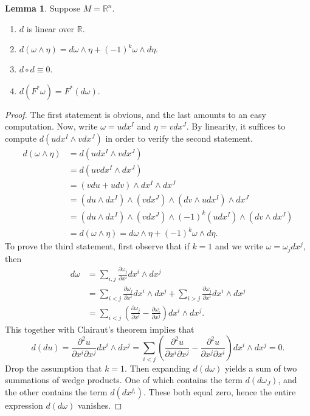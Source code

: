 \documentclass[10pt,letterpaper,cm]{nupset}
\theoremstyle{definition}
\theoremstyle{theorem}
\newtheorem{lemma}[definition]{Lemma}
\theoremstyle{remark}
\newcommand{\R}{\mathbb R}
\newcommand{\1}{\mathbf{1}}
\newcommand{\0}{\vec 0}
\begin{document}
\begin{lemma}\label{l15} Suppose $M = \R^n$.
\begin{enumerate}
\item $d$ is linear over $\R$.
\item $d( \omega \wedge \eta) = d \omega \wedge \eta + ({-}1)^k\omega \wedge d \eta.$
\item $d \circ d \equiv 0$.
\item $d(F^{\ast} \omega) = F^{\ast}(d \omega).$
\end{enumerate}
\end{lemma}
\begin{proof}
The first statement is obvious, and the last amounts to an easy computation. Now, write $\omega = udx^I$ and $\eta = v dx^J$. By linearity, it suffices to compute $d(udx^I \wedge v dx^J)$ in order to verify the second statement. 
\begin{align*}
 d(\omega \wedge \eta) &= d(udx^I \wedge vdx^J) \\
& = d(uvdx^I \wedge dx^J)
\\ & = (vdu + udv) \wedge dx^I \wedge dx^J
\\ & = (du \wedge dx^I) \wedge (v dx^J) \wedge (dv \wedge u dx^I) \wedge dx^J
\\ & = (du \wedge dx^I) \wedge (v dx^J) \wedge ({-}1)^k(udx^I) \wedge (dv \wedge dx^J)
\\ & = d( \omega \wedge \eta) = d \omega \wedge \eta + ({-}1)^k\omega \wedge d \eta .
\end{align*}
To prove the third statement, first observe that if $k=1$ and we write $\omega = \omega_jdx^j$, then 
\begin{align*}
d \omega & =   \sum_{i, j}\frac{\partial{\omega_j}}{\partial{x^i}}dx^i \wedge dx^j 
\\ & = \sum_{i< j}\frac{\partial{\omega_j}}{\partial{x^i}}dx^i \wedge dx^j + \sum_{i>j}\frac{\partial{\omega_j}}{\partial{x^i}}dx^i \wedge dx^j 
\\ & =\sum_{i<j}\left(\frac{\partial{\omega_j}}{\partial{x^i}} - \frac{\partial{\omega_i}}{\partial{x^j}}\right)dx^i \wedge dx^j.
\end{align*} This together with Clairaut's theorem implies that  $$d(du) =\frac{\partial^2{u}}{\partial{x^i}\partial{x^j}}dx^i \wedge dx^j = \sum_{i<j}\left( \frac{\partial^2{u}}{\partial{x^i}\partial{x^j}} - \frac{\partial^2{u}}{\partial{x^j}\partial{x^i}}\right)dx^i \wedge dx^j = 0.  $$ Drop the assumption that $k=1$. Then expanding $d(d\omega)$ yields a sum of two summations of wedge products. One of which contains the term $d(d\omega_J)$, and the other contains the term $d(dx^{j_i})$. These both equal zero, hence the entire expression $d(d\omega)$ vanishes.
\end{proof}
\end{document}
